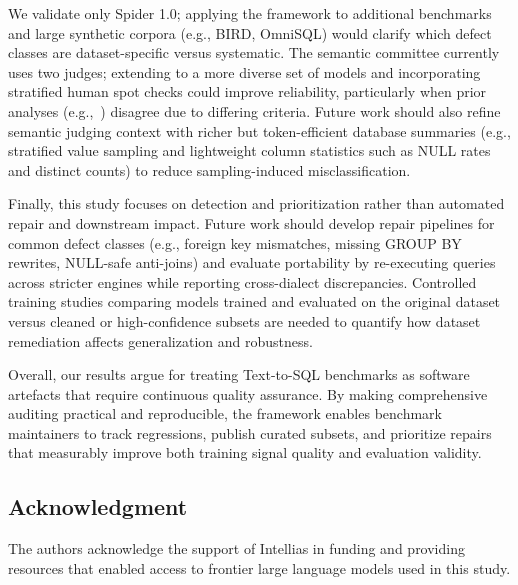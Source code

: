 \documentclass[]{einformatica}
\begin{document}
We validate only Spider 1.0; applying the framework to additional benchmarks and large synthetic corpora (e.g., BIRD, OmniSQL) would clarify which defect classes are dataset-specific versus systematic. The semantic committee currently uses two judges; extending to a more diverse set of models and incorporating stratified human spot checks could improve reliability, particularly when prior analyses (e.g.,~\cite{liu2025nl2sqlbugs}) disagree due to differing criteria. Future work should also refine semantic judging context with richer but token-efficient database summaries (e.g., stratified value sampling and lightweight column statistics such as NULL rates and distinct counts) to reduce sampling-induced misclassification.

Finally, this study focuses on detection and prioritization rather than automated repair and downstream impact. Future work should develop repair pipelines for common defect classes (e.g., foreign key mismatches, missing GROUP BY rewrites, NULL-safe anti-joins) and evaluate portability by re-executing queries across stricter engines while reporting cross-dialect discrepancies. Controlled training studies comparing models trained and evaluated on the original dataset versus cleaned or high-confidence subsets are needed to quantify how dataset remediation affects generalization and robustness.

Overall, our results argue for treating Text-to-SQL benchmarks as software artefacts that require continuous quality assurance. By making comprehensive auditing practical and reproducible, the framework enables benchmark maintainers to track regressions, publish curated subsets, and prioritize repairs that measurably improve both training signal quality and evaluation validity.

\subsection*{Acknowledgment}

The authors acknowledge the support of Intellias in funding and providing resources that enabled access to frontier large language models used in this study.


\end{document}
